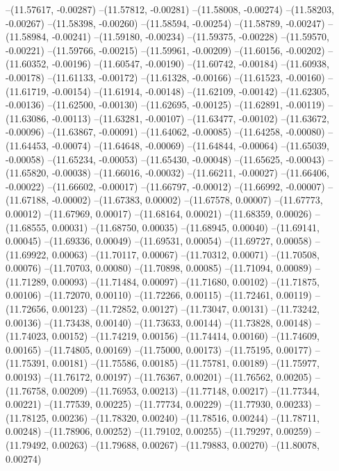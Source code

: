 --(11.57617, -0.00287)
--(11.57812, -0.00281)
--(11.58008, -0.00274)
--(11.58203, -0.00267)
--(11.58398, -0.00260)
--(11.58594, -0.00254)
--(11.58789, -0.00247)
--(11.58984, -0.00241)
--(11.59180, -0.00234)
--(11.59375, -0.00228)
--(11.59570, -0.00221)
--(11.59766, -0.00215)
--(11.59961, -0.00209)
--(11.60156, -0.00202)
--(11.60352, -0.00196)
--(11.60547, -0.00190)
--(11.60742, -0.00184)
--(11.60938, -0.00178)
--(11.61133, -0.00172)
--(11.61328, -0.00166)
--(11.61523, -0.00160)
--(11.61719, -0.00154)
--(11.61914, -0.00148)
--(11.62109, -0.00142)
--(11.62305, -0.00136)
--(11.62500, -0.00130)
--(11.62695, -0.00125)
--(11.62891, -0.00119)
--(11.63086, -0.00113)
--(11.63281, -0.00107)
--(11.63477, -0.00102)
--(11.63672, -0.00096)
--(11.63867, -0.00091)
--(11.64062, -0.00085)
--(11.64258, -0.00080)
--(11.64453, -0.00074)
--(11.64648, -0.00069)
--(11.64844, -0.00064)
--(11.65039, -0.00058)
--(11.65234, -0.00053)
--(11.65430, -0.00048)
--(11.65625, -0.00043)
--(11.65820, -0.00038)
--(11.66016, -0.00032)
--(11.66211, -0.00027)
--(11.66406, -0.00022)
--(11.66602, -0.00017)
--(11.66797, -0.00012)
--(11.66992, -0.00007)
--(11.67188, -0.00002)
--(11.67383, 0.00002)
--(11.67578, 0.00007)
--(11.67773, 0.00012)
--(11.67969, 0.00017)
--(11.68164, 0.00021)
--(11.68359, 0.00026)
--(11.68555, 0.00031)
--(11.68750, 0.00035)
--(11.68945, 0.00040)
--(11.69141, 0.00045)
--(11.69336, 0.00049)
--(11.69531, 0.00054)
--(11.69727, 0.00058)
--(11.69922, 0.00063)
--(11.70117, 0.00067)
--(11.70312, 0.00071)
--(11.70508, 0.00076)
--(11.70703, 0.00080)
--(11.70898, 0.00085)
--(11.71094, 0.00089)
--(11.71289, 0.00093)
--(11.71484, 0.00097)
--(11.71680, 0.00102)
--(11.71875, 0.00106)
--(11.72070, 0.00110)
--(11.72266, 0.00115)
--(11.72461, 0.00119)
--(11.72656, 0.00123)
--(11.72852, 0.00127)
--(11.73047, 0.00131)
--(11.73242, 0.00136)
--(11.73438, 0.00140)
--(11.73633, 0.00144)
--(11.73828, 0.00148)
--(11.74023, 0.00152)
--(11.74219, 0.00156)
--(11.74414, 0.00160)
--(11.74609, 0.00165)
--(11.74805, 0.00169)
--(11.75000, 0.00173)
--(11.75195, 0.00177)
--(11.75391, 0.00181)
--(11.75586, 0.00185)
--(11.75781, 0.00189)
--(11.75977, 0.00193)
--(11.76172, 0.00197)
--(11.76367, 0.00201)
--(11.76562, 0.00205)
--(11.76758, 0.00209)
--(11.76953, 0.00213)
--(11.77148, 0.00217)
--(11.77344, 0.00221)
--(11.77539, 0.00225)
--(11.77734, 0.00229)
--(11.77930, 0.00233)
--(11.78125, 0.00236)
--(11.78320, 0.00240)
--(11.78516, 0.00244)
--(11.78711, 0.00248)
--(11.78906, 0.00252)
--(11.79102, 0.00255)
--(11.79297, 0.00259)
--(11.79492, 0.00263)
--(11.79688, 0.00267)
--(11.79883, 0.00270)
--(11.80078, 0.00274)
